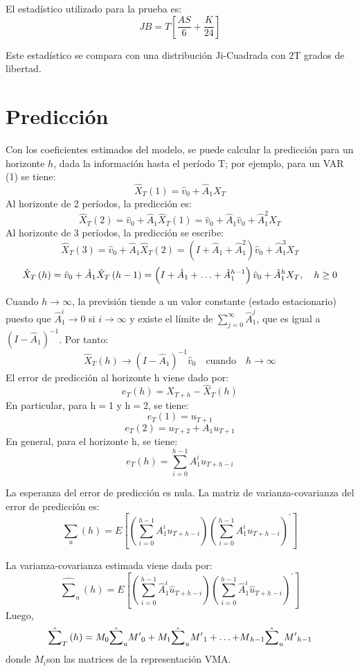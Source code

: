 El estad\'{i}stico utilizado para la prueba es: 
\[
JB=T\left[ \frac{AS}{6}+\frac{K}{24} \right]
\]

Este estad\'{i}stico se compara con una distribuci\'{o}n Ji-Cuadrada con 2T grados de libertad. 

\section{Predicci\'{o}n}
\label{subsec:mylabel8}

Con los coeficientes estimados del modelo, se puede calcular la predicci\'{o}n para un horizonte $h$, dada la informaci\'{o}n hasta el per\'{i}odo T; por ejemplo, para un VAR (1) se tiene:
\[
\hat{X}_{T}(1)=\hat{v}_{0}+\hat{A}_{1}X_{T}
\]
Al horizonte de 2 per\'{i}odos, la predicci\'{o}n es:
\[
\hat{X}_{T}\left( 2 \right)=\hat{v}_{0}+\hat{A}_{1}\hat{X}_{T}\left( 1 \right)=\hat{v}_{0}+\hat{A}_{1}\hat{v}_{0}+\hat{A}_{1}^{2}X_{T}
\]
Al horizonte de 3 per\'{i}odos, la predicci\'{o}n se escribe: 
\[
\hat{X}_{T}\left( 3 \right)=\hat{v}_{0}+\hat{A}_{1}\hat{X}_{T}\left( 2 \right)=\left( I+\hat{A}_{1}+\hat{A}_{1}^{2} 
\right)\hat{v}_{0}+\hat{A}_{1}^{3}X_{T}
\]
\[
\hat{X}_{T}\left( h \right)=\hat{v}_{0}+\hat{A}_{1}\hat{X}_{T}\left( h-1 \right)=\left( I+\hat{A}_{1}+\mathellipsis 
+\hat{A}_{1}^{h-1} \right)\hat{v}_{0}+\hat{A}_{1}^{h}X_{T},\quad h\geq 0
\]

Cuando $h\to \infty $, la previsi\'{o}n tiende a un valor constante (estado estacionario) puesto que $\hat{A}_{1}^{i}\to 0
$ si $i\to \infty $ y existe el l\'{i}mite de $\sum_{j=0}^\infty \hat{A}_{1}^{j} $, que es igual a $\left( I-\hat{A}_{1} \right)^{-1}$. Por tanto:
\[
\hat{X}_{T}\left( h \right)\to \left( I-\hat{A}_{1} \right)^{-1}\hat{v}_{0}\quad \text{cuando}\quad h\to \infty 
\]
El error de predicci\'{o}n al horizonte h viene dado por:
\[
e_{T}\left( h \right)=X_{T+h}-\hat{X}_{T}(h)
\]
En particular, para h$=$1 y h$=$2, se tiene:
\[
e_{T}\left( 1 \right)=u_{T+1}
\]
\[
e_{T}\left( 2 \right)=u_{T+2}+A_{1}u_{T+1}
\]
En general, para el horizonte h, se tiene:
\[
e_{T}\left( h \right)=\displaystyle\sum_{i=0}^{h-1} {A_{1}^{i}u_{T+h-i}} 
\]

La esperanza del error de predicci\'{o}n es nula. La matriz de varianza-covarianza del error de predicci\'{o}n es:
\[
\sum_{u}\left( h \right)=E\left[ \left( \sum_{i=0}^{h-1} {A_{1}^{i}u_{T+h-i}} \right)\left( \sum_{i=0}^{h-1} 
{A_{1}^{i}u_{T+h-i}} \right)^{'} \right]
\]

La varianza-covarianza estimada viene dada por:
\[
\hat{\sum }_{u}\left( h \right)=E\left[ \left( \sum_{i=0}^{h-1} {\hat{A}_{1}^{i}\hat{u}_{T+h-i}} \right)\left( \sum_{i=0}^{h-1} {\hat{A}_{1}^{i}\hat{u}_{T+h-i}} \right)^{'} \right]
\]
Luego,
\[
\hat{\sum }_{T}\left( h \right)=M_{0}\hat{\sum }_{u}{M'}_{0}+M_{1}\hat{\sum }_{u}{M'}_{1}+\mathellipsis {+M}_{h-1}\hat{\sum }_{u}{M'}_{h-1}
\]
donde $M_{i} $son las matrices de la representaci\'{o}n VMA.\newline

